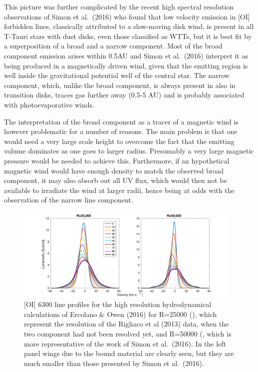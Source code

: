 \documentclass[10pt,fleqn,twoside]{article}
\begin{document}
This picture was further complicated by the recent high spectral
resolution observations of  Simon et al.\ (2016)  who found that low velocity
emission in [OI] forbidden lines, classically attributed to a
slow-moving disk wind, is present in all T-Tauri stars with
dust disks, even those classified as WTTs, but it is best fit
by a superposition of a broad and a narrow component. 
Most of the broad component emission
arises within 0.5AU and Simon et al.\ (2016) interpret it
as being produced in a magnetically driven wind, given that the
emitting region is well inside the gravitational 
potential well 
of the central star. The narrow component, which, unlike the broad
component, is always present in also in transition
disks, traces gas further away (0.5-5 AU) and is probably associated
with photoevaporative winds.

The interpretation of the broad component as a tracer of a magnetic
wind is however problematic for a number of reasons. The main problem
is that one would need a very large scale height to overcome the fact
that the emitting volume dominates as one goes to larger
radius. Presumably a very large magnetic pressure would be needed to
achieve this. Furthermore, if an hypothetical magnetic wind would
have enough density to match the observed broad component, it may also absorb
out all UV flux, which would then not be available to irradiate the
wind at larger radii, hence being at odds with the observation of the
narrow line component. 

 \begin{figure}
   \centering
   \includegraphics[width=0.97\textwidth]{lines_both.pdf}
  
   \caption{[OI] 6300 line
profiles for the high resolution hydrodynamical calculations of
Ercolano \& Owen (2016) for R=25000 (), 
which represent the resolution of the
Rigliaco et al (2013) data, when the two component had not been
resolved yet, and R=50000 (, which is more representative
of the work of Simon et al.\ (2016). In the left panel wings due to the
bound material are clearly seen, but they are much smaller than those
presented by Simon et al.\ (2016).
}
              \label{fig:wings}
    \end{figure}
\end{document}

